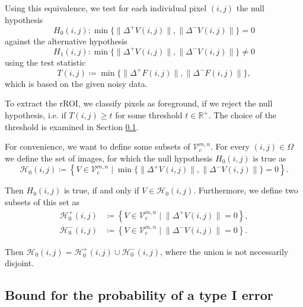 \documentclass[a4paper,12pt]{article}
\newcommand{\norm}[1]{\lVert#1\rVert}
\theoremstyle{plain}
\theoremstyle{definition}
\begin{document}
Using this equivalence, we test for each individual pixel $(i, j)$ the null hypothesis
\begin{equation}\label{nullhypothesis}
	H_0(i, j): \min \{ \norm{\Delta^+ V(i, j)}, \norm{\Delta^- V(i, j)} \} = 0
\end{equation}
against the alternative hypothesis
\begin{equation}\label{alternativehypothesis}
	H_1(i, j): \min \{ \norm{\Delta^+ V(i, j)}, \norm{\Delta^- V(i, j)} \} \neq 0
\end{equation}
using the test statistic
\begin{equation}\label{teststatistic}
	T(i, j) \coloneqq \min \{ \norm{\Delta^+ F(i, j)}, \norm{\Delta^- F(i, j)} \},
\end{equation}
which is based on the given noisy data.

To extract the rROI, we classify pixels as foreground, if we reject the null hypothesis, i.e. if $T(i, j) \geq t$ for some threshold $t \in \mathbb{R}^+$. The choice of the threshold is examined in Section \ref{section: boundtypeIerror}.

For convenience, we want to define some subsets of $\mathcal{V}_c^{m, n}$. For every $(i, j) \in \Omega$ we define the set of images, for which the null hypothesis $H_0(i, j)$ is true as
\begin{equation}
	\mathcal{H}_0(i, j) \coloneqq \left\{ V \in \mathcal{V}_c^{m, n} \mid \min \{ \norm{\Delta^+ V(i, j)}, \norm{\Delta^- V(i, j)} \} = 0 \right\}.
\end{equation}

Then $H_0(i, j)$ is true, if and only if $V \in \mathcal{H}_0(i, j)$. Furthermore, we define two subsets of this set as
\begin{align}
	\mathcal{H}_0^+(i, j) &\coloneqq \left\{ V \in \mathcal{V}_c^{m, n} \mid \norm{\Delta^+ V(i, j)} = 0 \right\} \label{setH0+}, \\
	\mathcal{H}_0^-(i, j) &\coloneqq \left\{ V \in \mathcal{V}_c^{m, n} \mid \norm{\Delta^- V(i, j)} = 0 \right\} \label{setH0-}.
\end{align}

Then $\mathcal{H}_0(i, j) = \mathcal{H}_0^+(i, j) \cup \mathcal{H}_0^-(i, j)$, where the union is not necessarily disjoint.



\subsection{Bound for the probability of a type I error}\label{section: boundtypeIerror}
\end{document}
